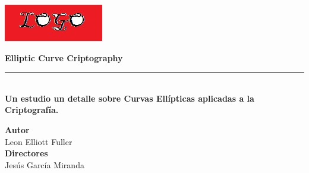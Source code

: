 \begin{titlepage}
 
 
    \setlength{\centeroffset}{-0.5\oddsidemargin}
    \addtolength{\centeroffset}{0.5\evensidemargin}
    \thispagestyle{empty}
    
    \noindent\hspace*{\centeroffset}\begin{minipage}{\textwidth}
    
    \centering
    
    
     \vspace{3.3cm}
    
    \includegraphics{imagenes/logo.png} 
     \vspace{0.5cm}
    
    
    {\Huge\bfseries Elliptic Curve Criptography\\
    }
    \noindent\rule[-1ex]{\textwidth}{3pt}\\[3.5ex]
    {\large\bfseries Un estudio un detalle sobre Curvas Ellípticas aplicadas a la Criptografía.\\[4cm]}
    \end{minipage}
    
    \vspace{2.5cm}
    \noindent\hspace*{\centeroffset}\begin{minipage}{\textwidth}
    \centering
    
    \textbf{Autor}\\ {Leon Elliott Fuller}\\[2.5ex]
    \textbf{Directores}\\
    Jesús García Miranda\\[2cm]
    \end{minipage}
    
     
    \end{titlepage}
    
    
    